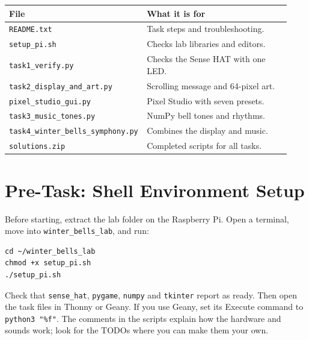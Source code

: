 \documentclass[12pt]{article}
\begin{document}
\small
\setlength{\tabcolsep}{3pt}
\renewcommand{\arraystretch}{0.94}
\begin{tabular}{p{0.42\linewidth}p{0.51\linewidth}}
\toprule
\textbf{File} & \textbf{What it is for} \\
\midrule
\texttt{README.txt} & Task steps and troubleshooting. \\
\texttt{setup\_pi.sh} & Checks lab libraries and editors. \\
\texttt{task1\_verify.py} & Checks the Sense HAT with one LED. \\
\texttt{task2\_display\_and\_art.py} & Scrolling message and 64-pixel art. \\
\texttt{pixel\_studio\_gui.py} & Pixel Studio with seven presets. \\
\texttt{task3\_music\_tones.py} & NumPy bell tones and rhythms. \\
\texttt{task4\_winter\_bells\_symphony.py} & Combines the display and music. \\
\texttt{solutions.zip} & Completed scripts for all tasks. \\
\bottomrule
\end{tabular}
\normalsize

\section*{Pre-Task: Shell Environment Setup}
Before starting, extract the lab folder on the Raspberry Pi. Open a terminal, move into \texttt{winter\_bells\_lab}, and run:
\begin{lstlisting}
cd ~/winter_bells_lab
chmod +x setup_pi.sh
./setup_pi.sh
\end{lstlisting}
Check that \texttt{sense\_hat}, \texttt{pygame}, \texttt{numpy} and \texttt{tkinter} report as ready. Then open the task files in Thonny or Geany. If you use Geany, set its Execute command to \texttt{python3 "\%f"}. The comments in the scripts explain how the hardware and sounds work; look for the TODOs where you can make them your own.
\end{document}
